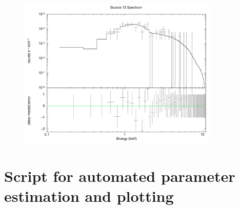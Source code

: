 \documentclass[aps,
                pra,  
                a4paper, 
                amsmath, 
                amssymb, 
                preprint,
                tightenlines,  
                amsfonts,
                nofootinbib,
                notitlepage
            ]{revtex4-2}
\begin{document}
\begin{figure}
    \centering
    \includegraphics[width=0.85\textwidth, angle=0, origin=c]{img/src-13-spectrum.jpg}
    \caption{}
\end{figure}

\section{Script for automated parameter estimation and plotting}

\end{document}
